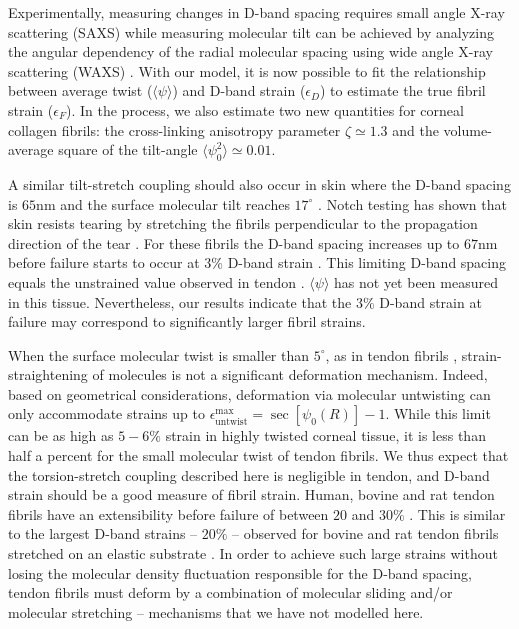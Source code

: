 \documentclass[preprint,12pt]{elsarticle}
\begin{document}
Experimentally, measuring changes in D-band spacing requires small angle X-ray scattering \cite{Sasaki:1996, Gautieri:2017} (SAXS) while measuring molecular tilt can be achieved by analyzing the angular dependency of the radial molecular spacing using wide angle X-ray scattering (WAXS) \cite{Bell:2018}. With our model, it is now possible to fit the relationship between average twist ($\langle \psi \rangle$) and D-band strain ($\epsilon_D$) to estimate the true fibril strain ($\epsilon_F$). In the process, we also estimate two new quantities for corneal collagen fibrils: the cross-linking anisotropy parameter $\zeta \simeq 1.3$ and the volume-average square of the tilt-angle $\langle \psi_0^2 \rangle \simeq 0.01$. 

A similar tilt-stretch coupling should also occur in skin where the D-band spacing is $65\mathrm{nm}$ \cite{Brodsky:1980} and the surface molecular tilt reaches $17^\circ$ \cite{Ottani:2001, Mechanic:1987}. Notch testing has shown that skin resists tearing by stretching the fibrils perpendicular to the propagation direction of the tear \cite{Yang:2015}. For these fibrils the D-band spacing increases up to $67\mathrm{nm}$ before failure starts to occur at $3\%$ D-band strain \cite{Yang:2015}. This limiting D-band spacing equals the unstrained value observed in tendon \cite{Quan:2015}.  $\langle \psi \rangle$ has not yet been measured in this tissue. Nevertheless, our results indicate that the $3\%$ D-band strain at failure may correspond to significantly larger fibril strains. 

When the surface molecular twist is smaller than $5^\circ$, as in tendon fibrils \cite{Hulmes:1981}, strain-straightening of molecules is not a significant deformation mechanism. Indeed, based on geometrical considerations, deformation via molecular untwisting can only accommodate strains up to  $\epsilon_\mathrm{untwist}^\mathrm{max}=\sec\left[\psi_0(R)\right]-1$. While this limit can be as high as $5-6\%$ strain in highly twisted corneal tissue, it is less than half a percent for the small molecular twist of tendon fibrils. We thus expect that the torsion-stretch coupling described here is negligible in tendon, and D-band strain should be a good measure of fibril strain. Human, bovine and rat tendon fibrils have an extensibility before failure of between $20$ and $30\%$ \cite{Quigley:2018, Svensson:2013}. This is similar to the largest D-band strains  -- $20\%$ -- observed for bovine and rat tendon fibrils stretched on an elastic substrate \cite{Gachon:2020, Peacock:2019}. In order to achieve such large strains without losing the molecular density fluctuation responsible for the D-band spacing, tendon fibrils must deform by a combination of molecular sliding \cite{Gautieri:2017, Peacock:2019} and/or molecular stretching \cite{Iqbal:2019} -- mechanisms that we have not modelled here. 
\end{document}
